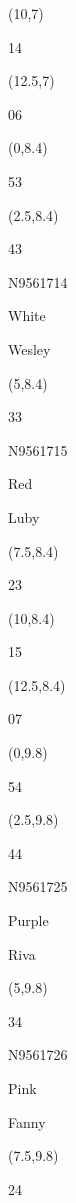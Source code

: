 \documentclass[a4paper]{article}
\newcommand{\myseat}[4]{%
\vspace{-0.1cm}
\parbox[t][2.2cm][t]{3.5cm}{
\small #1 %
\begin{description}
\vspace{-0.1cm}
\item [ID:] #2
\vspace{-0.1cm}
\item [Team:] #3 \normalsize
\vspace{-0.1cm}
\item \normalsize #4
\vspace{-0.1cm}
\end{description}
}
}
\begin{document}
\begin{CJK}{UTF8}{cyberbit}
\begin{textblock}{2.5}(10,7)
\textblockcolor{}
\myseat{14}{}{}{}
\end{textblock}

\begin{textblock}{2.5}(12.5,7)
\textblockcolor{}
\myseat{06}{}{}{}
\end{textblock}

\begin{textblock}{2.5}(0,8.4)
\textblockcolor{}
\myseat{53}{}{}{}
\end{textblock}

\begin{textblock}{2.5}(2.5,8.4)
\myseat{43}{N9561714}{White}{Wesley}
\end{textblock}

\begin{textblock}{2.5}(5,8.4)
\myseat{33}{N9561715}{Red}{Luby}
\end{textblock}

\begin{textblock}{2.5}(7.5,8.4)
\textblockcolor{}
\myseat{23}{}{}{}
\end{textblock}

\begin{textblock}{2.5}(10,8.4)
\textblockcolor{}
\myseat{15}{}{}{}
\end{textblock}

\begin{textblock}{2.5}(12.5,8.4)
\textblockcolor{}
\myseat{07}{}{}{}
\end{textblock}

\begin{textblock}{2.5}(0,9.8)
\textblockcolor{}
\myseat{54}{}{}{}
\end{textblock}

\begin{textblock}{2.5}(2.5,9.8)
\myseat{44}{N9561725}{Purple}{Riva}
\end{textblock}

\begin{textblock}{2.5}(5,9.8)
\myseat{34}{N9561726}{Pink}{Fanny}
\end{textblock}

\begin{textblock}{2.5}(7.5,9.8)
\textblockcolor{}
\myseat{24}{}{}{}
\end{textblock}


\end{CJK}
\end{document}
